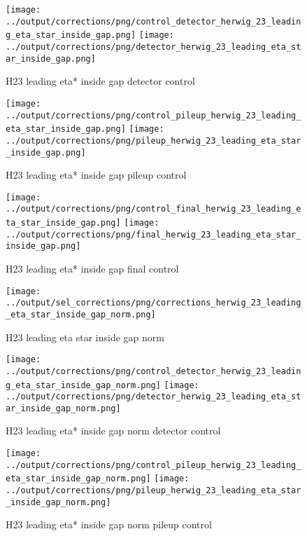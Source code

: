\documentclass[11pt]{book}
\begin{document}
\begin{figure}[ht]
\centering
\texttt{[image: ../output/corrections/png/control\_detector\_herwig\_23\_leading\_eta\_star\_inside\_gap.png]}
\texttt{[image: ../output/corrections/png/detector\_herwig\_23\_leading\_eta\_star\_inside\_gap.png]}
\caption{H23 leading eta* inside gap detector control}
\label{fig:H23_leading_eta_star_inside_gap_detector_control}
\end{figure}

\begin{figure}[ht]
\centering
\texttt{[image: ../output/corrections/png/control\_pileup\_herwig\_23\_leading\_eta\_star\_inside\_gap.png]}
\texttt{[image: ../output/corrections/png/pileup\_herwig\_23\_leading\_eta\_star\_inside\_gap.png]}
\caption{H23 leading eta* inside gap pileup control}
\label{fig:H23_leading_eta_star_inside_gap_pileup_control}
\end{figure}


\begin{figure}[ht]
\centering
\texttt{[image: ../output/corrections/png/control\_final\_herwig\_23\_leading\_eta\_star\_inside\_gap.png]}
\texttt{[image: ../output/corrections/png/final\_herwig\_23\_leading\_eta\_star\_inside\_gap.png]}
\caption{H23 leading eta* inside gap final control}
\label{fig:H23_leading_eta_star_inside_gap_final_control}
\end{figure}

\begin{figure}[ht]
\centering
\texttt{[image: ../output/sel\_corrections/png/corrections\_herwig\_23\_leading\_eta\_star\_inside\_gap\_norm.png]}
\caption{H23 leading eta star inside gap norm}
\label{fig:H23_leading_eta_star_inside_gap_norm}
\end{figure}


\begin{figure}[ht]
\centering
\texttt{[image: ../output/corrections/png/control\_detector\_herwig\_23\_leading\_eta\_star\_inside\_gap\_norm.png]}
\texttt{[image: ../output/corrections/png/detector\_herwig\_23\_leading\_eta\_star\_inside\_gap\_norm.png]}
\caption{H23 leading eta* inside gap norm detector control}
\label{fig:H23_leading_eta_star_inside_gap_norm_detector_control}
\end{figure}

\begin{figure}[ht]
\centering
\texttt{[image: ../output/corrections/png/control\_pileup\_herwig\_23\_leading\_eta\_star\_inside\_gap\_norm.png]}
\texttt{[image: ../output/corrections/png/pileup\_herwig\_23\_leading\_eta\_star\_inside\_gap\_norm.png]}
\caption{H23 leading eta* inside gap norm pileup control}
\label{fig:H23_leading_eta_star_inside_gap_norm_pileup_control}
\end{figure}
\end{document}
